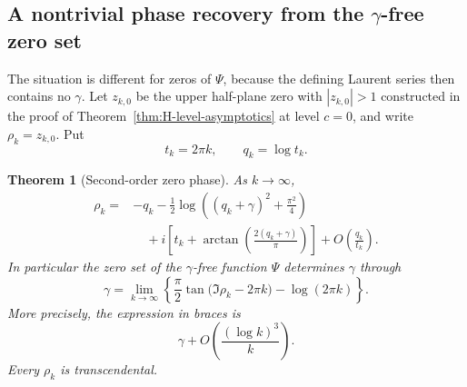 \documentclass[11pt]{article}
\newtheorem{theorem}{Theorem}[section]
\theoremstyle{definition}
\theoremstyle{remark}
\begin{document}
\subsection{A nontrivial phase recovery from the
\texorpdfstring{$\gamma$}{gamma}-free zero set}

The situation is different for zeros of $\Psi$, because the defining
Laurent series then contains no $\gamma$.  Let $z_{k,0}$ be the upper
half-plane zero with $|z_{k,0}|>1$ constructed in the proof of
Theorem~\ref{thm:H-level-asymptotics} at level $c=0$, and write
$\rho_k=z_{k,0}$.  Put
\[
 t_k=2\pi k,
 \qquad q_k=\log t_k.
\]

\begin{theorem}[Second-order zero phase]
\label{thm:gamma-free-zero-phase}
As $k\to\infty$,
\begin{align}
 \rho_k={}&-q_k-\frac12\log\left((q_k+\gamma)^2+\frac{\pi^2}{4}\right)
 \label{eq:rho-second-order}\\
 &\quad+i\left[t_k+\arctan\left(\frac{2(q_k+\gamma)}{\pi}\right)\right]
 +O\left(\frac{q_k}{t_k}\right).\nonumber
\end{align}
In particular the zero set of the $\gamma$-free function $\Psi$ determines
$\gamma$ through
\begin{equation}\label{eq:gamma-phase-recovery}
 \boxed{
 \gamma=\lim_{k\to\infty}
 \left\{
  \frac\pi2\tan\bigl(\Im\rho_k-2\pi k\bigr)-\log(2\pi k)
 \right\}.}
\end{equation}
More precisely, the expression in braces is
\begin{equation}\label{eq:gamma-phase-rate}
 \gamma+O\!\left(\frac{(\log k)^3}{k}\right).
\end{equation}
Every $\rho_k$ is transcendental.
\end{theorem}
\end{document}
